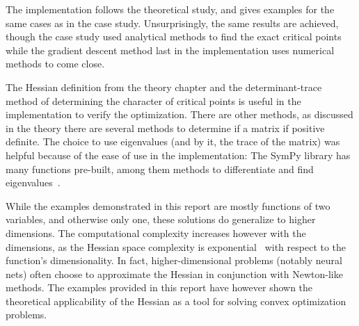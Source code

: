 \documentclass[../convex_optimization.tex]{subfiles}
\begin{document}
The implementation follows the theoretical study, and gives examples
for the same cases as in the case study.
Unsurprisingly, the same results are achieved, though the case study
used analytical methods to find the exact critical points while
the gradient descent method last in the implementation uses
numerical methods to come close.

The Hessian definition from the theory chapter and the determinant-trace
method of determining the character of critical points is useful in the
implementation to verify the optimization. There are other methods,
as discussed in the theory there are several methods to determine if a
matrix if positive definite. The choice to use eigenvalues (and by it,
the trace of the matrix) was helpful because of the ease of use in the
implementation: The SymPy library has many functions pre-built, among
them methods to differentiate and find eigenvalues~\cite{sympy}.

While the examples demonstrated in this report are mostly functions of
two variables, and otherwise only one, these solutions do generalize 
to higher dimensions. The computational complexity increases however with
the dimensions, as the Hessian space complexity is exponential~\cite{hessian_wiki} with respect to the function's dimensionality.
In fact, higher-dimensional problems (notably neural nets) often choose
to approximate the Hessian in conjunction with Newton-like methods.
The examples provided in this report have however shown the theoretical
applicability of the Hessian as a tool for solving convex optimization problems.
\end{document}
